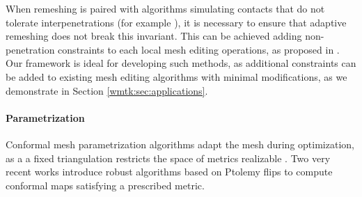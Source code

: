 When remeshing is paired with algorithms simulating contacts that do not tolerate interpenetrations (for example \cite{Li2020IPC}), it is necessary to ensure that adaptive remeshing does not break this invariant. This can be achieved adding non-penetration constraints to each local mesh editing operations, as proposed in \cite{Brochu:2012}. Our framework is ideal for developing such methods, as additional constraints can be added to existing mesh editing algorithms with minimal modifications, as we demonstrate in Section \ref{wmtk:sec:applications}.








\paragraph{Parametrization} 

Conformal mesh parametrization algorithms adapt the mesh during optimization, as a a fixed triangulation restricts the space of metrics realizable \cite{luo2004combinatorial,Campen:2017:SimilarityMaps,campen2018seamless,gu2018discrete,gu2018discrete2,springborn2019ideal,sun2015discrete}. Two very recent works \cite{Gillespie:2021:DCE,Campen:2021} introduce robust algorithms based on Ptolemy flips to compute conformal maps satisfying a prescribed metric.

